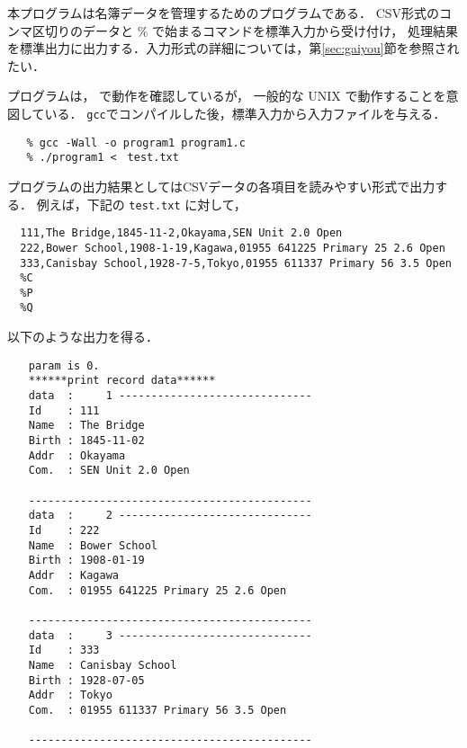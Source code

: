 \documentclass[a4j,11pt]{jarticle}
\begin{document}
本プログラムは名簿データを管理するためのプログラムである．
CSV形式のコンマ区切りのデータと \% で始まるコマンドを標準入力から受け付け，
処理結果を標準出力に出力する．入力形式の詳細については，第\ref{sec:gaiyou}節を参照されたい．

プログラムは，                                   で動作を確認しているが，
一般的な UNIX で動作することを意図している．
\verb|gcc|でコンパイルした後，標準入力から入力ファイルを与える．

{\fontsize{10pt}{11pt} \selectfont
 \begin{verbatim}
   % gcc -Wall -o program1 program1.c
   % ./program1 <　test.txt
 \end{verbatim}
}
プログラムの出力結果としてはCSVデータの各項目を読みやすい形式で出力する．
例えば，下記の \verb|test.txt| に対して，

{\fontsize{10pt}{11pt} \selectfont
 \begin{verbatim}
  111,The Bridge,1845-11-2,Okayama,SEN Unit 2.0 Open
  222,Bower School,1908-1-19,Kagawa,01955 641225 Primary 25 2.6 Open
  333,Canisbay School,1928-7-5,Tokyo,01955 611337 Primary 56 3.5 Open
  %C
  %P
  %Q
 \end{verbatim}
}
\noindent %
以下のような出力を得る．

{\fontsize{10pt}{11pt} \selectfont
 \begin{verbatim}
　　param is 0.
　　******print record data******
　　data  :     1 ------------------------------
　　Id    : 111
　　Name  : The Bridge
　　Birth : 1845-11-02
　　Addr  : Okayama
　　Com.  : SEN Unit 2.0 Open

　　--------------------------------------------
　　data  :     2 ------------------------------
　　Id    : 222
　　Name  : Bower School
　　Birth : 1908-01-19
　　Addr  : Kagawa
　　Com.  : 01955 641225 Primary 25 2.6 Open

　　--------------------------------------------
　　data  :     3 ------------------------------
　　Id    : 333
　　Name  : Canisbay School
　　Birth : 1928-07-05
　　Addr  : Tokyo
　　Com.  : 01955 611337 Primary 56 3.5 Open

　　--------------------------------------------

 \end{verbatim}
}
\end{document}
